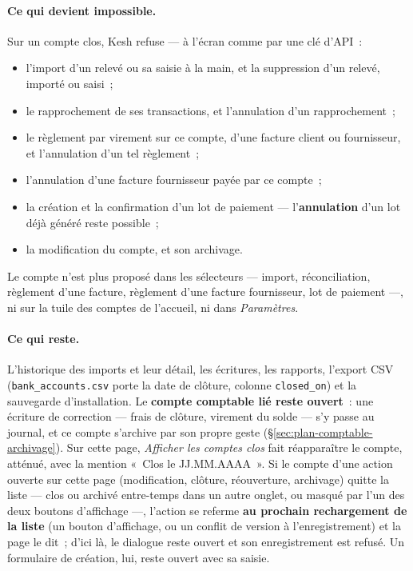 \documentclass[a4paper,11pt,oneside]{article}
\begin{document}
\paragraph{Ce qui devient impossible.} Sur un compte clos, Kesh refuse --- à l'écran comme par
une clé d'API~:
\begin{itemize}
    \item l'import d'un relevé ou sa saisie à la main, et la suppression d'un relevé, importé ou
          saisi~;
    \item le rapprochement de ses transactions, et l'annulation d'un rapprochement~;
    \item le règlement par virement sur ce compte, d'une facture client ou fournisseur, et
          l'annulation d'un tel règlement~;
    \item l'annulation d'une facture fournisseur payée par ce compte~;
    \item la création et la confirmation d'un lot de paiement --- l'\textbf{annulation} d'un lot
          déjà généré reste possible~;
    \item la modification du compte, et son archivage.
\end{itemize}
Le compte n'est plus proposé dans les sélecteurs --- import, réconciliation, règlement d'une
facture, règlement d'une facture fournisseur, lot de paiement ---, ni sur la tuile des comptes de
l'accueil, ni dans \emph{Paramètres}.

\paragraph{Ce qui reste.} L'historique des imports et leur détail, les écritures, les rapports,
l'export CSV (\texttt{bank\_accounts.csv} porte la date de clôture, colonne
\texttt{closed\_on}) et la sauvegarde d'installation. Le \textbf{compte comptable lié reste
ouvert}~: une écriture de correction --- frais de clôture, virement du solde --- s'y passe au
journal, et ce compte s'archive par son propre geste (\S\ref{sec:plan-comptable-archivage}).
Sur cette page, \emph{Afficher les comptes clos} fait réapparaître le compte, atténué, avec la
mention «~Clos le JJ.MM.AAAA~». Si le compte d'une action ouverte sur cette page (modification,
clôture, réouverture, archivage) quitte la liste --- clos ou archivé entre-temps dans un autre onglet,
ou masqué par l'un des deux boutons d'affichage ---, l'action se referme \textbf{au prochain
rechargement de la liste} (un bouton d'affichage, ou un conflit de version à l'enregistrement) et la
page le dit~; d'ici là, le dialogue reste ouvert et son enregistrement est refusé. Un formulaire de
création, lui, reste ouvert avec sa saisie.
\end{document}
